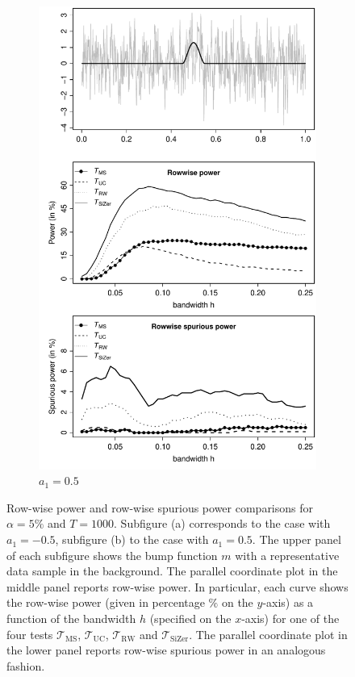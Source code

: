 \begin{figure}[t!]
\begin{subfigure}{0.5\textwidth}
\includegraphics[width=\linewidth]{Plots/pcp_power_T_1000_a1_50.pdf}
\caption{$a_1 = 0.5$}
\end{subfigure}
\caption{Row-wise power and row-wise spurious power comparisons for $\alpha=5\%$ and $T=1000$. Subfigure (a) corresponds to the case with $a_1=-0.5$, subfigure (b) to the case with $a_1=0.5$. The upper panel of each subfigure shows the bump function $m$ with a representative data sample in the background. The parallel coordinate plot in the middle panel reports row-wise power. In particular, each curve shows the row-wise power (given in percentage $\%$ on the $y$-axis) as a function of the bandwidth $h$ (specified on the $x$-axis) for one of the four tests $\mathcal{T}_{\text{MS}}$, $\mathcal{T}_{\text{UC}}$, $\mathcal{T}_{\text{RW}}$ and $\mathcal{T}_{\text{SiZer}}$. The parallel coordinate plot in the lower panel reports row-wise spurious power in an analogous fashion.}\label{fig:sim:power:bump}
\end{figure}


